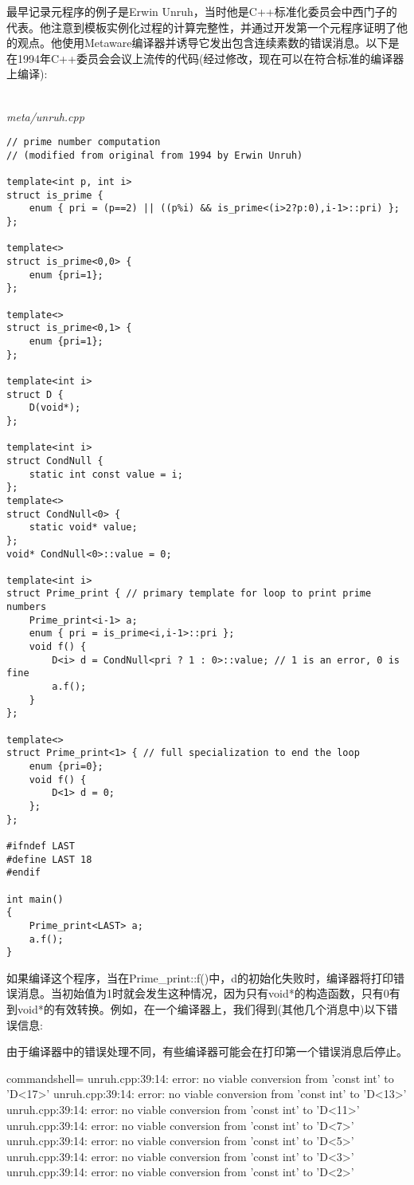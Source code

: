 最早记录元程序的例子是Erwin Unruh，当时他是C++标准化委员会中西门子的代表。他注意到模板实例化过程的计算完整性，并通过开发第一个元程序证明了他的观点。他使用Metaware编译器并诱导它发出包含连续素数的错误消息。以下是在1994年C++委员会会议上流传的代码(经过修改，现在可以在符合标准的编译器上编译):

\hspace*{\fill} \\ %
\noindent
\textit{meta/unruh.cpp}
\begin{lstlisting}[style=styleCXX]
// prime number computation
// (modified from original from 1994 by Erwin Unruh)

template<int p, int i>
struct is_prime {
	enum { pri = (p==2) || ((p%i) && is_prime<(i>2?p:0),i-1>::pri) };
};

template<>
struct is_prime<0,0> {
	enum {pri=1};
};

template<>
struct is_prime<0,1> {
	enum {pri=1};
};

template<int i>
struct D {
	D(void*);
};

template<int i>
struct CondNull {
	static int const value = i;
};
template<>
struct CondNull<0> {
	static void* value;
};
void* CondNull<0>::value = 0;

template<int i>
struct Prime_print { // primary template for loop to print prime numbers
	Prime_print<i-1> a;
	enum { pri = is_prime<i,i-1>::pri };
	void f() {
		D<i> d = CondNull<pri ? 1 : 0>::value; // 1 is an error, 0 is fine
		a.f();
	}
};

template<>
struct Prime_print<1> { // full specialization to end the loop
	enum {pri=0};
	void f() {
		D<1> d = 0;
	};
};

#ifndef LAST
#define LAST 18
#endif

int main()
{
	Prime_print<LAST> a;
	a.f();
}
\end{lstlisting}

如果编译这个程序，当在Prime\_print::f()中，d的初始化失败时，编译器将打印错误消息。当初始值为1时就会发生这种情况，因为只有void*的构造函数，只有0有到void*的有效转换。例如，在一个编译器上，我们得到(其他几个消息中)以下错误信息:

\begin{tcolorbox}[colback=webgreen!5!white,colframe=webgreen!75!black]
\hspace*{0.75cm}由于编译器中的错误处理不同，有些编译器可能会在打印第一个错误消息后停止。
\end{tcolorbox}

{\footnotesize
\begin{tcblisting}{commandshell={}}
unruh.cpp:39:14: error: no viable conversion from ’const int’ to ’D<17>’
unruh.cpp:39:14: error: no viable conversion from ’const int’ to ’D<13>’
unruh.cpp:39:14: error: no viable conversion from ’const int’ to ’D<11>’
unruh.cpp:39:14: error: no viable conversion from ’const int’ to ’D<7>’
unruh.cpp:39:14: error: no viable conversion from ’const int’ to ’D<5>’
unruh.cpp:39:14: error: no viable conversion from ’const int’ to ’D<3>’
unruh.cpp:39:14: error: no viable conversion from ’const int’ to ’D<2>’
\end{tcblisting}
}

